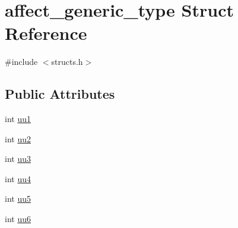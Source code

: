 \hypertarget{structaffect__generic__type}{\section{affect\-\_\-generic\-\_\-type Struct Reference}
\label{structaffect__generic__type}
}


{\ttfamily \#include $<$structs.\-h$>$}

\subsection*{Public Attributes}
\begin{DoxyCompactItemize}
\item 
int \hyperlink{structaffect__generic__type_a29417f5ee3da60dc9ced6255371b75ea}{uu1}
\item 
int \hyperlink{structaffect__generic__type_ae4950fdd58ea8c5e128059bd32a9cd21}{uu2}
\item 
int \hyperlink{structaffect__generic__type_a9154b481d4ab7eafc8d0b26056b5160a}{uu3}
\item 
int \hyperlink{structaffect__generic__type_a48eea014b87c0a691b59f142134d48f9}{uu4}
\item 
int \hyperlink{structaffect__generic__type_ae5ddf58b7ef69938b13f767a37387846}{uu5}
\item 
int \hyperlink{structaffect__generic__type_ab8f0e319c3bf6a92853fdce86ee5af68}{uu6}
\end{DoxyCompactItemize}



